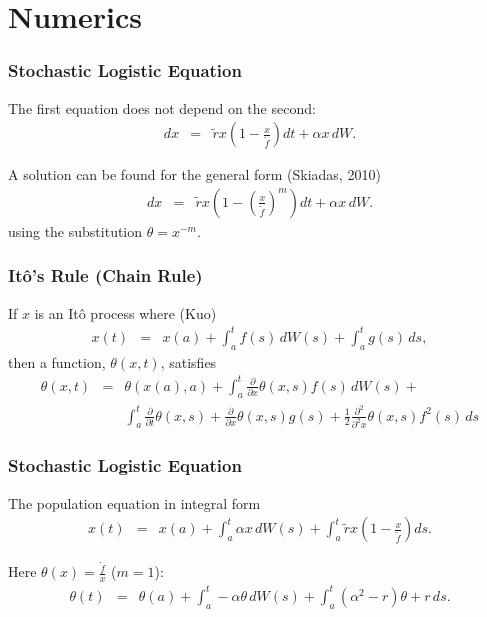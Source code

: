 \documentclass{beamer}   %
\newcommand{\lp}{\left(}
\newcommand{\rp}{\right)}
\newcommand{\half}{\frac{1}{2}}
\newcommand{\pderiv}[1]{\frac{\partial}{\partial {#1}}}
\newcommand{\mderiv}[2]{\frac{\partial^{#1}}{\partial^{#1} {#2}}}
\begin{document}
\section{Numerics}

\begin{frame}
  \frametitle{Stochastic Logistic Equation}

  The first equation does not depend on the second:
  \begin{eqnarray*}
    dx &=& \tilde{r} x \lp 1- \frac{x}{\tilde{f}}\rp dt +\alpha x \, dW.
  \end{eqnarray*}

  \vfill

  A solution can be found for the general form (Skiadas, 2010)
  \begin{eqnarray*}
    dx &=& \tilde{r} x \lp 1- \lp\frac{x}{\tilde{f}}\rp^m\rp dt +\alpha x \, dW.
  \end{eqnarray*}
  using the substitution $\theta=x^{-m}$.

  
\end{frame}

\begin{frame}
  \frametitle{It\^o's Rule (Chain Rule)}

  If $x$ is an It\^o process where (Kuo)
  \begin{eqnarray*}
    x(t) & = & x(a) + \int^t_a f(s) \, dW(s) + \int^t_a g(s) \, ds,
  \end{eqnarray*}
  then a function, $\theta(x,t)$, satisfies
  \begin{eqnarray*}
    \theta(x,t) & = & \theta(x(a),a) + 
    \int^t_a \pderiv{x} \theta(x,s) f(s) \, dW(s) + \\
    & & \int^t_a \pderiv{t} \theta(x,s) + \pderiv{x} \theta(x,s) g(s) + \half \mderiv{2}{x} \theta(x,s) f^2(s) \, ds
  \end{eqnarray*}

  
\end{frame}

\begin{frame}
  \frametitle{Stochastic Logistic Equation}

  The population equation in integral form
  \begin{eqnarray*}
    x(t) &=& x(a) + \int_a^t \alpha x \, dW(s) + \int_a^t \tilde{r} x \lp 1- \frac{x}{\tilde{f}}\rp ds.
  \end{eqnarray*}

  \vfill

  Here $\theta(x)=\frac{\tilde{f}}{x}$ ($m=1$):
  \begin{eqnarray*}
    \theta(t) &=& \theta(a) + \int^t_a -\alpha\theta \, dW(s) +
    \int^t_a \lp \alpha^2-r \rp \theta + r \, ds.
  \end{eqnarray*}

\end{frame}
\end{document}

